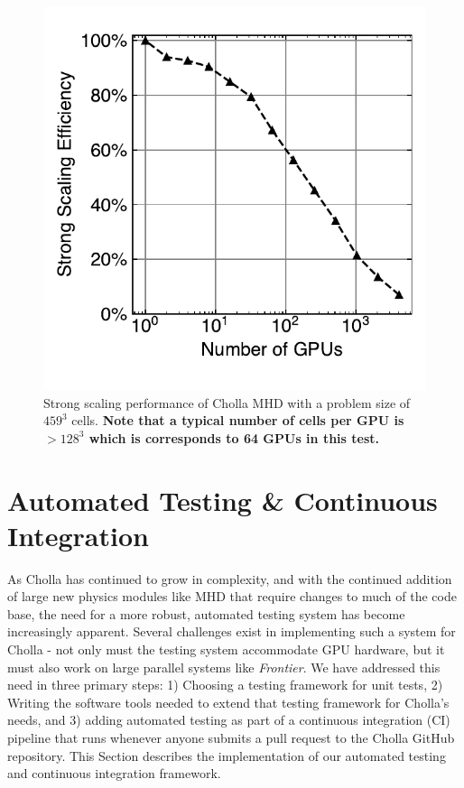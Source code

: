 \documentclass[modern, linenumbers]{aastex631}
\newcommand*{\img}[1]{%
    \raisebox{-.05\baselineskip}{%
        \texttt{[image: \#1]}%
    }%
}
\begin{document}
\begin{figure}[ht!]
    \centering
    \includegraphics{latex-src/scaling_test_strong_efficiency.pdf}
    \caption{Strong scaling performance of Cholla MHD with a problem size of $459^3$ cells. \textbf{Note that a typical number of cells per GPU is $>128^3$ which is corresponds to 64 GPUs in this test.} \href{https://zenodo.org/records/10927223}{\img{zenodo-gradient-200.png}}}
    \label{fig:scaling-strong}
\end{figure}

\section{Automated Testing \& Continuous Integration}
\label{sec:testing}

As Cholla has continued to grow in complexity, and with the continued addition of large new physics modules like MHD that require changes to much of the code base, the need for a more robust, automated testing system has become increasingly apparent. Several challenges exist in implementing such a system for Cholla - not only must the testing system accommodate GPU hardware, but it must also work on large parallel systems like \textit{Frontier}. We have addressed this need in three primary steps: 1) Choosing a testing framework for unit tests, 2) Writing the software tools needed to extend that testing framework for Cholla's needs, and 3) adding automated testing as part of a continuous integration (CI) pipeline that runs whenever anyone submits a pull request to the Cholla GitHub repository. This Section describes the implementation of our automated testing and continuous integration framework.
\end{document}
